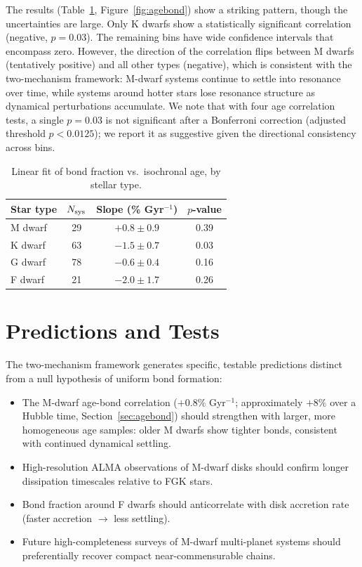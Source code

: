 \documentclass[twocolumn,usenatbib]{mnras}
\begin{document}
The results (Table~\ref{tab:agebond}, Figure~\ref{fig:agebond}) show a
striking pattern, though the uncertainties are large. Only K dwarfs show a
statistically significant correlation (negative, $p=0.03$). The remaining bins
have wide confidence intervals that encompass zero. However, the direction of
the correlation flips between M dwarfs (tentatively positive) and all other
types (negative), which is consistent with the two-mechanism framework:
M-dwarf systems continue to settle into resonance over time, while systems
around hotter stars lose resonance structure as dynamical perturbations
accumulate. We note that with four age correlation tests, a single $p=0.03$ is
not significant after a Bonferroni correction (adjusted threshold $p<0.0125$);
we report it as suggestive given the directional consistency across bins.

\begin{table}
\centering
\caption{Linear fit of bond fraction vs.\ isochronal age, by stellar type.}
\label{tab:agebond}
\begin{tabular}{lccc}
\hline
Star type & $N_{\rm sys}$ & Slope (\% Gyr$^{-1}$) & $p$-value\\
\hline
M dwarf & 29 & $+0.8 \pm 0.9$ & 0.39\\
K dwarf & 63 & $-1.5 \pm 0.7$ & 0.03\\
G dwarf & 78 & $-0.6 \pm 0.4$ & 0.16\\
F dwarf & 21 & $-2.0 \pm 1.7$ & 0.26\\
\hline
\end{tabular}
\end{table}

\section{Predictions and Tests}

The two-mechanism framework generates specific, testable predictions distinct
from a null hypothesis of uniform bond formation:
\begin{itemize}
  \item The M-dwarf age-bond correlation ($+0.8\%$ Gyr$^{-1}$; approximately
        $+8\%$ over a Hubble time,
        Section~\ref{sec:agebond}) should strengthen with larger, more
        homogeneous age samples: older M dwarfs show tighter bonds, consistent
        with continued dynamical settling.
  \item High-resolution ALMA observations of M-dwarf disks should confirm
        longer dissipation timescales relative to FGK stars.
  \item Bond fraction around F dwarfs should anticorrelate with disk accretion
        rate (faster accretion $\rightarrow$ less settling).
  \item Future high-completeness surveys of M-dwarf multi-planet systems should
        preferentially recover compact near-commensurable chains.
\end{itemize}
\end{document}
